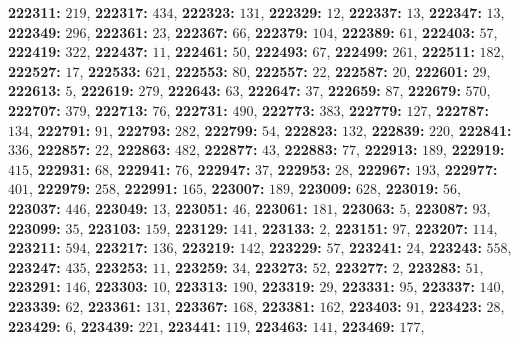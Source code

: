 \textsf{\bfseries 222311:} $219$, \textsf{\bfseries 222317:} $434$, \textsf{\bfseries 222323:} $131$, \textsf{\bfseries 222329:} $12$, \textsf{\bfseries 222337:} $13$, \textsf{\bfseries 222347:} $13$, \textsf{\bfseries 222349:} $296$, \textsf{\bfseries 222361:} $23$, \textsf{\bfseries 222367:} $66$, \textsf{\bfseries 222379:} $104$, \textsf{\bfseries 222389:} $61$, \textsf{\bfseries 222403:} $57$, \textsf{\bfseries 222419:} $322$, \textsf{\bfseries 222437:} $11$, \textsf{\bfseries 222461:} $50$, \textsf{\bfseries 222493:} $67$, \textsf{\bfseries 222499:} $261$, \textsf{\bfseries 222511:} $182$, \textsf{\bfseries 222527:} $17$, \textsf{\bfseries 222533:} $621$, \textsf{\bfseries 222553:} $80$, \textsf{\bfseries 222557:} $22$, \textsf{\bfseries 222587:} $20$, \textsf{\bfseries 222601:} $29$, \textsf{\bfseries 222613:} $5$, \textsf{\bfseries 222619:} $279$, \textsf{\bfseries 222643:} $63$, \textsf{\bfseries 222647:} $37$, \textsf{\bfseries 222659:} $87$, \textsf{\bfseries 222679:} $570$, \textsf{\bfseries 222707:} $379$, \textsf{\bfseries 222713:} $76$, \textsf{\bfseries 222731:} $490$, \textsf{\bfseries 222773:} $383$, \textsf{\bfseries 222779:} $127$, \textsf{\bfseries 222787:} $134$, \textsf{\bfseries 222791:} $91$, \textsf{\bfseries 222793:} $282$, \textsf{\bfseries 222799:} $54$, \textsf{\bfseries 222823:} $132$, \textsf{\bfseries 222839:} $220$, \textsf{\bfseries 222841:} $336$, \textsf{\bfseries 222857:} $22$, \textsf{\bfseries 222863:} $482$, \textsf{\bfseries 222877:} $43$, \textsf{\bfseries 222883:} $77$, \textsf{\bfseries 222913:} $189$, \textsf{\bfseries 222919:} $415$, \textsf{\bfseries 222931:} $68$, \textsf{\bfseries 222941:} $76$, \textsf{\bfseries 222947:} $37$, \textsf{\bfseries 222953:} $28$, \textsf{\bfseries 222967:} $193$, \textsf{\bfseries 222977:} $401$, \textsf{\bfseries 222979:} $258$, \textsf{\bfseries 222991:} $165$, \textsf{\bfseries 223007:} $189$, \textsf{\bfseries 223009:} $628$, \textsf{\bfseries 223019:} $56$, \textsf{\bfseries 223037:} $446$, \textsf{\bfseries 223049:} $13$, \textsf{\bfseries 223051:} $46$, \textsf{\bfseries 223061:} $181$, \textsf{\bfseries 223063:} $5$, \textsf{\bfseries 223087:} $93$, \textsf{\bfseries 223099:} $35$, \textsf{\bfseries 223103:} $159$, \textsf{\bfseries 223129:} $141$, \textsf{\bfseries 223133:} $2$, \textsf{\bfseries 223151:} $97$, \textsf{\bfseries 223207:} $114$, \textsf{\bfseries 223211:} $594$, \textsf{\bfseries 223217:} $136$, \textsf{\bfseries 223219:} $142$, \textsf{\bfseries 223229:} $57$, \textsf{\bfseries 223241:} $24$, \textsf{\bfseries 223243:} $558$, \textsf{\bfseries 223247:} $435$, \textsf{\bfseries 223253:} $11$, \textsf{\bfseries 223259:} $34$, \textsf{\bfseries 223273:} $52$, \textsf{\bfseries 223277:} $2$, \textsf{\bfseries 223283:} $51$, \textsf{\bfseries 223291:} $146$, \textsf{\bfseries 223303:} $10$, \textsf{\bfseries 223313:} $190$, \textsf{\bfseries 223319:} $29$, \textsf{\bfseries 223331:} $95$, \textsf{\bfseries 223337:} $140$, \textsf{\bfseries 223339:} $62$, \textsf{\bfseries 223361:} $131$, \textsf{\bfseries 223367:} $168$, \textsf{\bfseries 223381:} $162$, \textsf{\bfseries 223403:} $91$, \textsf{\bfseries 223423:} $28$, \textsf{\bfseries 223429:} $6$, \textsf{\bfseries 223439:} $221$, \textsf{\bfseries 223441:} $119$, \textsf{\bfseries 223463:} $141$, \textsf{\bfseries 223469:} $177$, 

